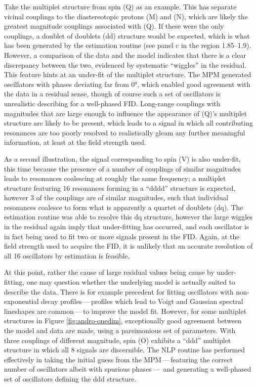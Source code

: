 Take the multiplet structure from spin (Q) as an example.
This has separate vicinal couplings to the
diastereotopic protons (M) and (N), which are likely the greatest magnitude couplings
associated with (Q). If these were the only couplings, a doublet of doublets
(dd) structure would be expected, which is what has been generated by
the estimation routine (see panel c in the region
\SIrange{1.85}{1.9}{\partspermillion}). However, a comparison of the data and
the model indicates that there is a clear discrepancy between the two,
evidenced by systematic ``wiggles'' in the residual. This feature hints at an
under-fit of the multiplet structure.
The \ac{MPM} generated oscillators with phases deviating far from \ang{0},
which enabled good agreement with the data in a residual sense, though of
course such a set of oscillators is unrealistic describing for a well-phased
\ac{FID}.
Long-range couplings with magnitudes that are large enough to influence the
appearance of (Q)'s multiplet structure are likely to be present, which leads
to a signal in which all contributing resonances are too poorly resolved to
realistically gleam any further meaningful information, at least at the field
strength used.

As a second illustration, the signal corresponding to spin (V) is also
under-fit, this time because the presence of a number of couplings of similar
magnitudes leads to resonances coalescing at roughly the same frequency; a
multiplet structure featuring 16 resonances forming in a ``dddd'' structure is
expected, however 3 of the couplings are of similar magnitudes, such that
individual resonances coalesce to form what is apparently a quartet of doublets (dq).
The estimation routine was able to resolve this dq structure,
however the large wiggles in the residual again imply that under-fitting has
occurred, and each oscillator is in fact being used to fit two or more
signals present in the \ac{FID}. Again, at the field strength used to
acquire the \ac{FID}, it is unlikely that an accurate resolution of all 16
oscillators by estimation is feasible.

At this point, rather the cause of large residual values being cause by
under-fitting, one may question whether the underlying model is actually suited
to describe the data.
There is for example precedent for fitting oscillators with non-exponential
decay profiles\,---\,profiles which lead to Voigt and Gaussian spectral
lineshapes are common\,---\,to improve the model fit\cite{Sima2007}.
However, for some multiplet structures in Figure \ref{fig:andro-onedim},
exceptionally good agreement between the model and data are made, using a
parsimonious set of parameters.
With three couplings of different magnitude, spin (O) exhibits a ``ddd''
multiplet structure in which all 8 signals are discernible. The \ac{NLP}
routine has performed effectively in taking the initial guess from the
\ac{MPM}\,---\,featuring the correct number of oscillators albeit with
spurious phases\,---\, and generating a well-phased set of oscillators defining
the ddd structure.

